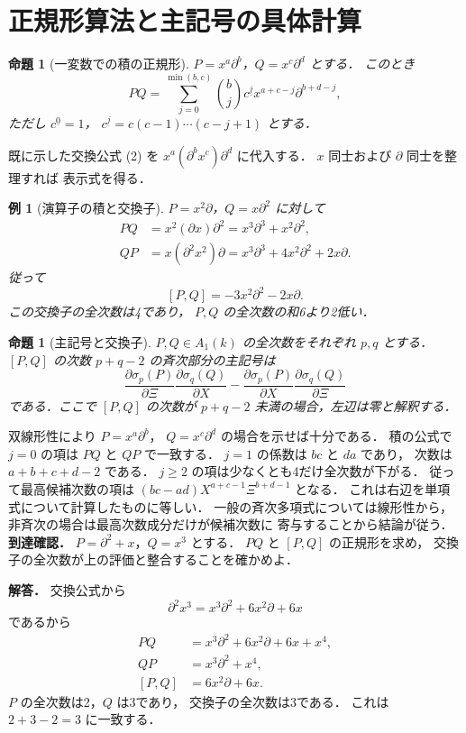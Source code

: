 \documentclass[a5paper,10pt,onecolumn]{jsarticle}
\makeatletter
\theoremstyle{mathnotetheorem}
\newtheorem{proposition}[theorem]{命題}
\newtheorem{example}[theorem]{例}
\renewcommand{\proofname}{証明}
\renewenvironment{proof}[1][\proofname]{%
  \par\pushQED{\qed}\normalfont\topsep4\p@\@plus2\p@\relax
  \trivlist\item[\hskip\labelsep\bfseries #1]\ignorespaces
}{\popQED\endtrivlist\@endpefalse}
\makeatother
\begin{document}
\section{正規形算法と主記号の具体計算}
\begin{proposition}[一変数での積の正規形]
$P=x^a\partial^b$，$Q=x^c\partial^d$ とする．
このとき
\[
 PQ=\sum_{j=0}^{\min(b,c)}
 \binom bj c^{\underline j}
 x^{a+c-j}\partial^{b+d-j},
\]
ただし $c^{\underline 0}=1$，
$c^{\underline j}=c(c-1)\cdots(c-j+1)$ とする．
\end{proposition}
\begin{proof}
既に示した交換公式 (2) を
$x^a(\partial^b x^c)\partial^d$ に代入する．
$x$ 同士および $\partial$ 同士を整理すれば
表示式を得る．
\end{proof}
\begin{example}[演算子の積と交換子]
$P=x^2\partial$，$Q=x\partial^2$ に対して
\[
 \begin{aligned}
 PQ&=x^2(\partial x)\partial^2
     =x^3\partial^3+x^2\partial^2,\\
 QP&=x(\partial^2x^2)\partial
     =x^3\partial^3+4x^2\partial^2+2x\partial.
 \end{aligned}
\]
従って
\[
 [P,Q]=-3x^2\partial^2-2x\partial.
\]
この交換子の全次数は4であり，
$P,Q$ の全次数の和6より2低い．
\end{example}
\begin{proposition}[主記号と交換子]
$P,Q\in A_1(k)$ の全次数をそれぞれ $p,q$ とする．
$[P,Q]$ の次数 $p+q-2$ の斉次部分の主記号は
\[
 \frac{\partial\sigma_p(P)}{\partial\Xi}
 \frac{\partial\sigma_q(Q)}{\partial X}
 -
 \frac{\partial\sigma_p(P)}{\partial X}
 \frac{\partial\sigma_q(Q)}{\partial\Xi}
\]
である．ここで $[P,Q]$ の次数が $p+q-2$
未満の場合，左辺は零と解釈する．
\end{proposition}
\begin{proof}
双線形性により $P=x^a\partial^b$，
$Q=x^c\partial^d$ の場合を示せば十分である．
積の公式で $j=0$ の項は $PQ$ と $QP$ で一致する．
$j=1$ の係数は $bc$ と $da$ であり，
次数は $a+b+c+d-2$ である．
$j\ge2$ の項は少なくとも4だけ全次数が下がる．
従って最高候補次数の項は
$(bc-ad)X^{a+c-1}\Xi^{b+d-1}$ となる．
これは右辺を単項式について計算したものに等しい．
一般の斉次多項式については線形性から，
非斉次の場合は最高次数成分だけが候補次数に
寄与することから結論が従う．
\end{proof}
\noindent\textbf{到達確認．}
$P=\partial^2+x$，$Q=x^3$ とする．
$PQ$ と $[P,Q]$ の正規形を求め，
交換子の全次数が上の評価と整合することを確かめよ．

\par\noindent\textbf{解答．}
交換公式から
\[
 \partial^2x^3=x^3\partial^2+6x^2\partial+6x
\]
であるから
\[
 \begin{aligned}
 PQ&=x^3\partial^2+6x^2\partial+6x+x^4,\\
 QP&=x^3\partial^2+x^4,\\
 [P,Q]&=6x^2\partial+6x.
 \end{aligned}
\]
$P$ の全次数は2，$Q$ は3であり，
交換子の全次数は3である．
これは $2+3-2=3$ に一致する．
\end{document}
